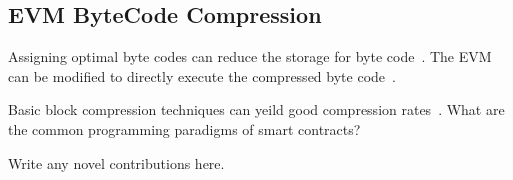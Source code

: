 
\subsection{EVM ByteCode Compression}\label{sec:evmcompress}

Assigning optimal byte codes can reduce the storage for byte code~\cite{aslam2010}.
The EVM can be modified to directly execute the compressed byte code~\cite{marc2003,evans2003}.

Basic block compression techniques can yeild good compression rates~\cite{clausen2000}. 
What are the common programming paradigms of smart contracts?

Write any novel contributions here.

